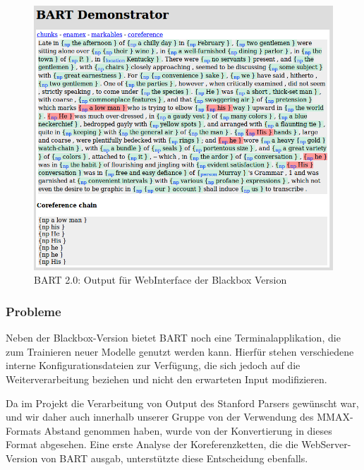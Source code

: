 \begin{figure}[ht]
\begin{center}
\includegraphics[width=12cm]{./img/cle/bart_webUI_output.png}
\caption{BART 2.0: Output für WebInterface der Blackbox Version}
\label{bart_webUI_output}
\end{center}
\end{figure}

\subsubsection{Probleme}

\noindent
Neben der Blackbox-Version bietet BART noch eine Terminalapplikation, 
die zum Trainieren neuer Modelle genutzt werden kann.
Hierfür stehen verschiedene interne Konfigurationsdateien zur Verfügung,
die sich jedoch auf die Weiterverarbeitung beziehen und nicht den erwarteten
Input modifizieren.

Da im Projekt die Verarbeitung von Output des Stanford Parsers gewünscht war,
und wir daher auch innerhalb unserer Gruppe von der Verwendung des MMAX-Formats 
Abstand genommen haben, wurde von der Konvertierung in dieses Format abgesehen.
Eine erste Analyse der Koreferenzketten, die die WebServer-Version von BART ausgab,
unterstützte diese Entscheidung ebenfalls.

